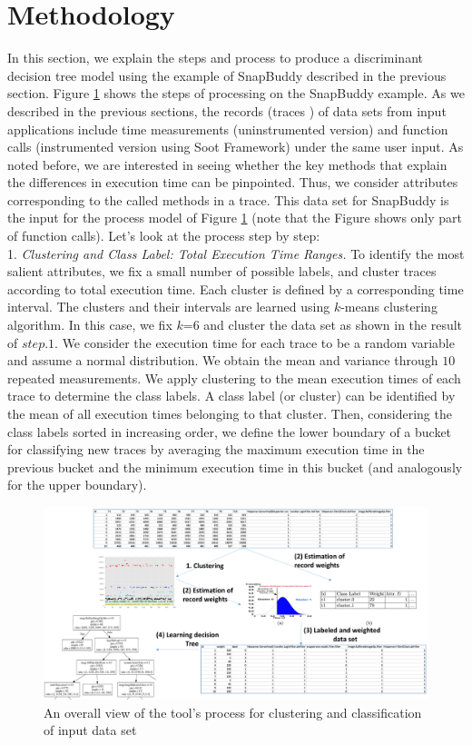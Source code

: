 \documentclass{article}
\begin{document}
\section{Methodology}
In this section, we explain the steps and process to produce a discriminant
decision tree model using the example of SnapBuddy described in the previous
section. Figure \ref{Methodology} shows the steps of processing on the SnapBuddy
example. As we described in the previous sections, the records (traces ) of data sets from
input applications include time measurements (uninstrumented version) and function
calls (instrumented version using Soot Framework) under the same user input. As noted before,
we are interested in seeing whether the key
methods that explain the differences in execution time can be pinpointed. Thus, we
consider attributes corresponding to the called methods in a trace. This data set for SnapBuddy
is the input for the process model of Figure \ref{Methodology} (note that the Figure shows
only part of function calls). 
Let's look at the process step by step: \\
1. \smallskip\textit{Clustering and Class Label: Total Execution Time Ranges.}
To identify the most salient attributes, we fix a small number of possible
labels, and cluster traces according to total execution time. 
Each cluster is defined by a corresponding time interval. The clusters and
their intervals are learned using $k$-means clustering
algorithm. In this case, we fix $k$=6 and cluster the data set as shown in the
result of $step.1$. We consider the execution time for each trace to be a
random variable and assume a normal distribution.
We obtain the mean and variance through $10$ repeated measurements.
We apply clustering to the mean execution times of each trace to
determine the class labels. A class label (or cluster) can be identified by the mean of
all execution times belonging to that cluster. Then, considering the
class labels sorted in increasing order, we define the lower boundary
of a bucket for classifying new traces by averaging the maximum
execution time in the previous bucket and the minimum execution time
in this bucket (and analogously for the upper boundary). 
\begin{figure}[t]
    \centering
    \includegraphics[width=1\textwidth]{Methodology}
    \caption{An overall view of the tool's process for clustering and classification of input data set}
    \label{Methodology}
\end{figure}
\end{document}
